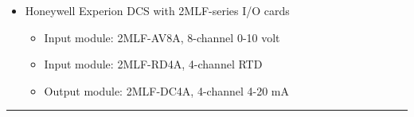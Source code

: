 {{{{\begin{itemize}
\begin{itemize}
\item{} Input module: M Series 2, DI 8-channel 24 VDC isolated
\item{} Input module: M Series 2, DI 8-channel 120 VAC dry contact
\item{} Input module: M Series 2, DI 8-channel 120 VAC isolated
\item{} Input module: M Series 2, AI 8-channel 4-20 mA
\item{} Input module: M Series 2, AI 8-channel 1-5 VDC
\item{} Input module: M Series 2, AI RTD, ohms
\item{} Input module: M Series 2, AI thermocouple, mV
\item{} Output module: M Series 2, DO 8-channel 24 VDC, high-side
\item{} Output module: M Series 2, DO 8-channel 24 VDC, isolated
\item{} Output module: M Series 2, DO 8-channel 120/230 VAC, high-side
\item{} Output module: M Series 2, DO 8-channel 120/230 VAC, isolated
\item{} Output module: M Series 2, AO 8-channel 4-20 mA
\vskip 2pt
\end{itemize}

\item{} Honeywell Experion DCS with 2MLF-series I/O cards
	
\begin{itemize}
\item{} Input module: 2MLF-AV8A, 8-channel 0-10 volt
\item{} Input module: 2MLF-RD4A, 4-channel RTD
\item{} Output module: 2MLF-DC4A, 4-channel 4-20 mA
\end{itemize}

\end{itemize}

} \hskip 3pt}%
\vskip 5pt \hrule}%
\vrule}




